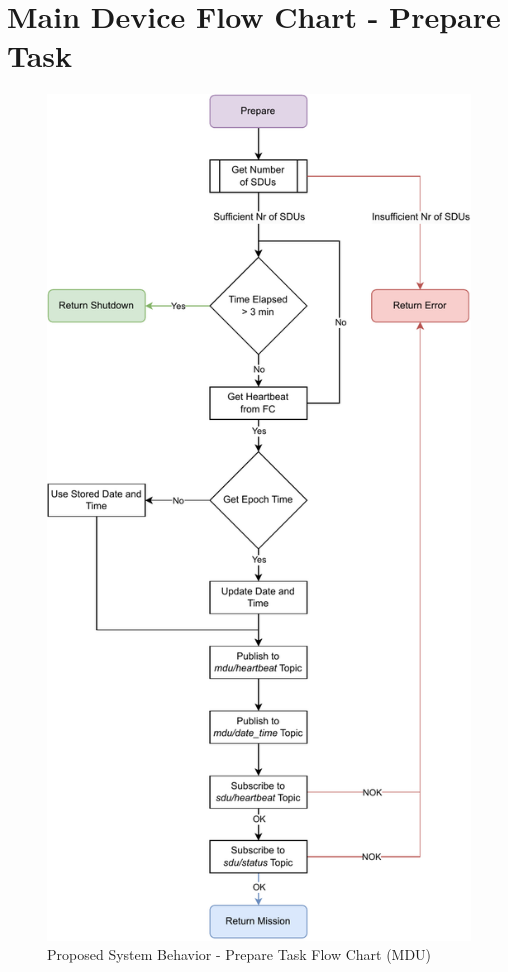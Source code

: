 
\chapter{Main Device Flow Chart - Prepare Task} %

\label{AppendixA}

\begin{figure}[H]
    \centering
    \includegraphics[scale=0.6]{appendices/assets/MDU_PREPARE.pdf}
    \caption{Proposed System Behavior - Prepare Task Flow Chart (MDU)}
    \label{fig:MDU_PREPARE}
\end{figure}

